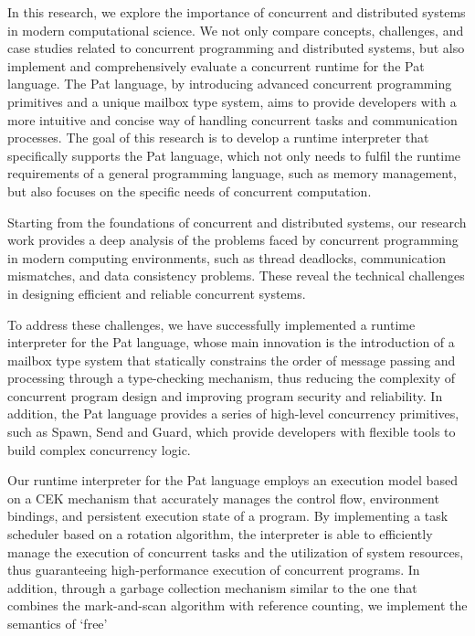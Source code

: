 \documentclass{l4proj}
\begin{document}
In this research, we explore the importance of concurrent and distributed systems in modern computational science. We not only compare concepts, challenges, and case studies related to concurrent programming and distributed systems, but also implement and comprehensively evaluate a concurrent runtime for the Pat language. The Pat language, by introducing advanced concurrent programming primitives and a unique mailbox type system, aims to provide developers with a more intuitive and concise way of handling concurrent tasks and communication processes. The goal of this research is to develop a runtime interpreter that specifically supports the Pat language, which not only needs to fulfil the runtime requirements of a general programming language, such as memory management, but also focuses on the specific needs of concurrent computation.

Starting from the foundations of concurrent and distributed systems, our research work provides a deep analysis of the problems faced by concurrent programming in modern computing environments, such as thread deadlocks, communication mismatches, and data consistency problems. These reveal the technical challenges in designing efficient and reliable concurrent systems.

To address these challenges, we have successfully implemented a runtime interpreter for the Pat language, whose main innovation is the introduction of a mailbox type system that statically constrains the order of message passing and processing through a type-checking mechanism, thus reducing the complexity of concurrent program design and improving program security and reliability. In addition, the Pat language provides a series of high-level concurrency primitives, such as Spawn, Send and Guard, which provide developers with flexible tools to build complex concurrency logic.

Our runtime interpreter for the Pat language employs an execution model based on a CEK mechanism that accurately manages the control flow, environment bindings, and persistent execution state of a program. By implementing a task scheduler based on a rotation algorithm, the interpreter is able to efficiently manage the execution of concurrent tasks and the utilization of system resources, thus guaranteeing high-performance execution of concurrent programs. In addition, through a garbage collection mechanism similar to the one that combines the mark-and-scan algorithm with reference counting, we implement the semantics of `free'
\end{document}
